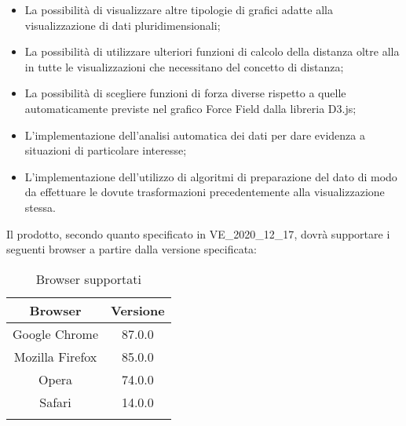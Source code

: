 \documentclass[../analisi-dei-requisiti.tex]{subfiles}
\begin{document}
\begin{itemize}
    \item La possibilità di visualizzare altre tipologie di grafici adatte alla visualizzazione di dati
    pluridimensionali;
    \item La possibilità di utilizzare ulteriori funzioni di calcolo della distanza oltre alla
     in tutte le visualizzazioni che necessitano del concetto di distanza;
    \item La possibilità di scegliere funzioni di forza diverse rispetto a quelle automaticamente previste nel grafico
    Force Field dalla libreria D3.js;
    \item L'implementazione dell'analisi automatica dei dati per dare evidenza a situazioni di particolare interesse;
    \item L'implementazione dell'utilizzo di algoritmi di preparazione del dato di modo da effettuare le dovute
    trasformazioni precedentemente alla visualizzazione stessa.
\end{itemize}

Il prodotto, secondo quanto specificato in \textsc{VE\_2020\_12\_17}, dovrà supportare i seguenti browser a partire dalla versione specificata:

\begin{table}
  \centering
  \label{tab:supporto_browser}
  \renewcommand{\arraystretch}{2} 
  
  \begin{tabular}{|c|c|}
  
    \hline
    \rowcolor{lightgray}
    
    \textbf{Browser} & \textbf{Versione}\\
    \hline
    Google Chrome & 87.0.0 \\
    Mozilla Firefox & 85.0.0\\
    Opera & 74.0.0 \\
    Safari & 14.0.0\\
    \hline
    \rowcolor{white}
    
  \end{tabular}
  \caption{Browser supportati}
\end{table}
\end{document}
